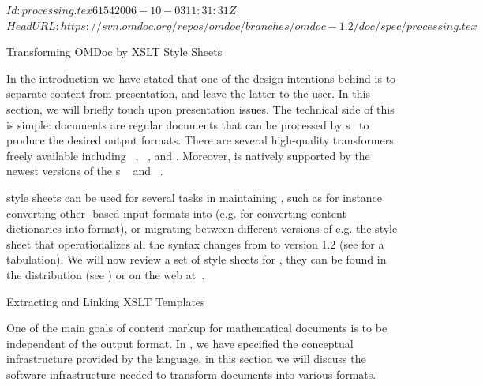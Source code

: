 \svnInfo $Id: processing.tex 6154 2006-10-03 11:31:31Z  $
\svnKeyword $HeadURL: https://svn.omdoc.org/repos/omdoc/branches/omdoc-1.2/doc/spec/processing.tex $

\begin{tchapter}[id=transform-xsl,short=Transforming OMDoc]{Transforming OMDoc by XSLT Style Sheets}

In the introduction we have stated that one of the design intentions behind
{\omdoc} is to separate content from presentation, and leave the latter to the
user. In this section, we will briefly touch upon presentation issues. The
technical side of this is simple: {\omdoc} documents are regular {\xml} documents
that can be processed by {\xslt} {s}~\cite{Clark:xslt99} to
produce the desired output formats. There are several high-quality {\xslt}
transformers freely available including {}~\cite{saxon_web},
{}~\cite{xalan_web}, and {}\cite{xsltproc_web}.
Moreover, {\xslt} is natively supported by the newest versions of the
{}s {\msie}~\cite{ie_web} and
{\mozilla}~\cite{mozilla_web}.

{\xslt} style sheets can be used for several tasks in maintaining {\omdoc}, such as for
instance converting other {\xml}-based input formats into {\omdoc} (e.g.
{} for converting {\openmath} content dictionaries into {\omdoc} format), or migrating between different versions of {\omdoc}
e.g. the style sheet {} that operationalizes all the
syntax changes from {} to version 1.2 (see {} for a
tabulation).  We will now review a set of {\xslt} style sheets for {\omdoc}, they can be
found in the {\omdoc} distribution (see {}) or on the web
at~\cite{OMDocXSL:URL}.

\begin{tsection}[id=extract-link-xslt]{Extracting and Linking XSLT Templates}

One of the main goals of content markup for mathematical documents is to be
independent of the output format. In {}, we have specified the
conceptual infrastructure provided by the {\omdoc} language, in this section we
will discuss the software infrastructure needed to transform {\omdoc} documents
into various formats.


\end{tsection}
\end{tchapter}
